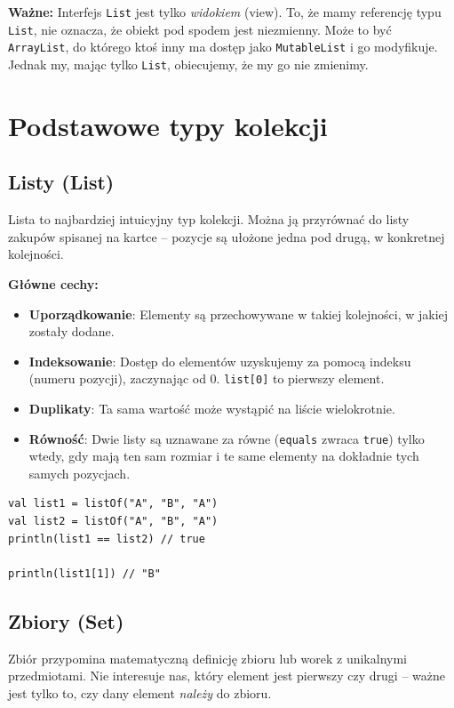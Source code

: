 \textbf{Ważne:} Interfejs \texttt{List} jest tylko \textit{widokiem} (view). To, że mamy referencję typu \texttt{List}, nie oznacza, że obiekt pod spodem jest niezmienny. Może to być \texttt{ArrayList}, do którego ktoś inny ma dostęp jako \texttt{MutableList} i go modyfikuje. Jednak my, mając tylko \texttt{List}, obiecujemy, że my go nie zmienimy.

\section{Podstawowe typy kolekcji}

\subsection{Listy (List)}
Lista to najbardziej intuicyjny typ kolekcji. Można ją przyrównać do listy zakupów spisanej na kartce – pozycje są ułożone jedna pod drugą, w konkretnej kolejności.

\textbf{Główne cechy:}
\begin{itemize}
    \item \textbf{Uporządkowanie}: Elementy są przechowywane w takiej kolejności, w jakiej zostały dodane.
    \item \textbf{Indeksowanie}: Dostęp do elementów uzyskujemy za pomocą indeksu (numeru pozycji), zaczynając od 0. \texttt{list[0]} to pierwszy element.
    \item \textbf{Duplikaty}: Ta sama wartość może wystąpić na liście wielokrotnie.
    \item \textbf{Równość}: Dwie listy są uznawane za równe (\texttt{equals} zwraca \texttt{true}) tylko wtedy, gdy mają ten sam rozmiar i te same elementy na dokładnie tych samych pozycjach.
\end{itemize}

\begin{verbatim}
val list1 = listOf("A", "B", "A")
val list2 = listOf("A", "B", "A")
println(list1 == list2) // true

println(list1[1]) // "B"
\end{verbatim}

\subsection{Zbiory (Set)}
Zbiór przypomina matematyczną definicję zbioru lub worek z unikalnymi przedmiotami. Nie interesuje nas, który element jest pierwszy czy drugi – ważne jest tylko to, czy dany element \textit{należy} do zbioru.

